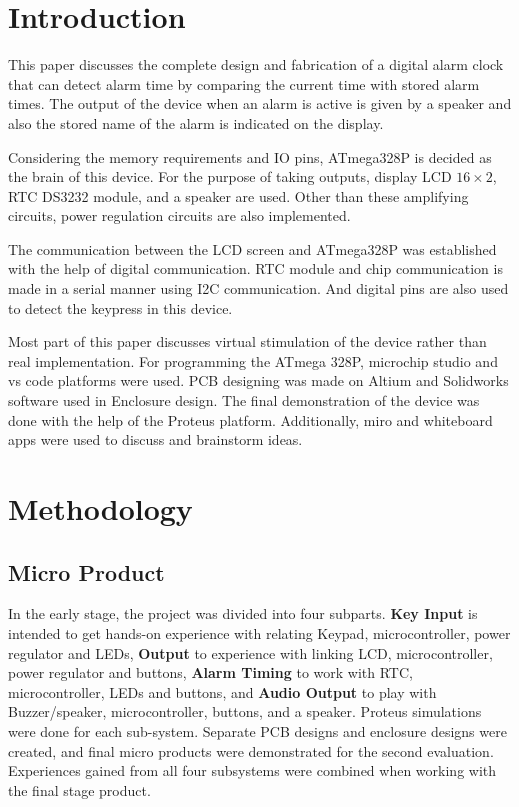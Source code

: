 \documentclass[12pt,twocolumn]{article}
\begin{document}
\section{Introduction}
This paper discusses the complete design and fabrication of a digital alarm clock that can detect alarm
time by comparing the current time with stored alarm times. The output of the device when an alarm is 
active is given by a speaker and also the stored name of the alarm is indicated on the display. 

Considering the memory requirements and IO pins, ATmega328P is decided as the brain of this device. 
For the purpose of taking outputs, display  LCD $16\times2$, RTC DS3232 module, and a speaker are used. Other than these 
amplifying circuits, power regulation circuits are also implemented.

The communication between the LCD screen and ATmega328P was established with the help of digital 
communication. RTC module and chip communication is made in a serial manner using I2C communication. 
And digital pins are also used to detect the keypress in this device.

Most part of this paper discusses virtual stimulation of the device rather than real implementation. 
For programming the ATmega 328P, microchip studio and vs code platforms were used. PCB designing was 
made on Altium and Solidworks software used in Enclosure design. The final demonstration of the device
was done with the help of the Proteus platform. Additionally, miro and whiteboard apps were used to 
discuss and brainstorm ideas.


\section{Methodology}
    \subsection{Micro Product}
In the early stage, the project was divided into four subparts. \textbf{Key Input} is intended to get hands-on
experience with relating Keypad, microcontroller, power regulator and LEDs,  \textbf{Output} to experience with
linking LCD, microcontroller, power regulator and buttons, \textbf{Alarm Timing} to work with RTC,
microcontroller, LEDs and buttons, and \textbf{Audio Output} to play with Buzzer/speaker, microcontroller,
buttons, and a speaker. Proteus simulations were done for each sub-system. Separate PCB designs and
enclosure designs were created, and final micro products were demonstrated for the second evaluation.
Experiences gained from all four subsystems were combined when working with the final stage product.  
\end{document}

